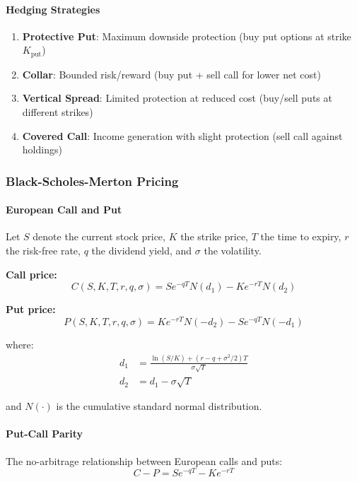 \paragraph{Hedging Strategies}

\begin{enumerate}
  \item \textbf{Protective Put}: Maximum downside protection (buy put options at strike $K_{\text{put}}$)
  \item \textbf{Collar}: Bounded risk/reward (buy put + sell call for lower net cost)
  \item \textbf{Vertical Spread}: Limited protection at reduced cost (buy/sell puts at different strikes)
  \item \textbf{Covered Call}: Income generation with slight protection (sell call against holdings)
\end{enumerate}

\subsubsection{Black-Scholes-Merton Pricing}

\paragraph{European Call and Put}

Let $S$ denote the current stock price, $K$ the strike price, $T$ the time to expiry, $r$ the risk-free rate, $q$ the dividend yield, and $\sigma$ the volatility.

\textbf{Call price:}
\[
C(S, K, T, r, q, \sigma) = S e^{-qT} N(d_1) - K e^{-rT} N(d_2)
\]

\textbf{Put price:}
\[
P(S, K, T, r, q, \sigma) = K e^{-rT} N(-d_2) - S e^{-qT} N(-d_1)
\]

where:
\begin{align*}
d_1 &= \frac{\ln(S/K) + (r - q + \sigma^2/2)T}{\sigma \sqrt{T}} \\
d_2 &= d_1 - \sigma \sqrt{T}
\end{align*}

and $N(\cdot)$ is the cumulative standard normal distribution.

\paragraph{Put-Call Parity}

The no-arbitrage relationship between European calls and puts:
\[
C - P = S e^{-qT} - K e^{-rT}
\]

